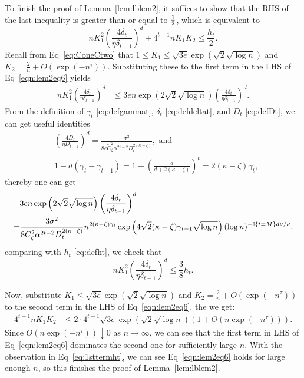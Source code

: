 To finish the proof of Lemma~\ref{lem:lblem2}, it suffices to show that the RHS of the last inequality is greater than or equal to $\frac{1}{2}$,
which is equivalent to
\begin{equation}
\label{eqn:lem2eq6}
n K_1^2 \left ( \frac{4\delta_t} {\eta \delta_{t-1}} \right )^d + 4^{t-1} n K_1 K_2 \leq \frac{h_t}{2}.
\end{equation}
Recall from Eq~\eqref{eq:ConeCtwo} that $1 \leq K_1 \leq \sqrt {3e} \exp(\sqrt 2 \sqrt {\log n})$
and $K_2 = \frac{2}{n} + O(\exp(-n^\tau))$. Substituting these to the first term in the LHS of Eq~\eqref{eqn:lem2eq6} yields
\begin{align*}
	n K_1^2 \left ( \frac{4\delta_t} {\eta \delta_{t-1}} \right )^d 
	&\leq 3 e n \exp \left (2\sqrt 2 \sqrt{\log n} \right ) \left ( \frac{4\delta_t} {\eta \delta_{t-1}} \right )^d.
\end{align*}
From the definition of $\gamma_t$ \eqref{eq:defgammat}, $\delta_t$ \eqref{eq:defdeltat}, and $D_t$ \eqref{eq:defDt},
we can get useful identities 
\begin{align*}
	&\left ( \frac{4D_t} {\eta D_{t-1}} \right )^d = \frac{\sigma^2}{8 e \tilde C_\zeta^2 \alpha^{2t-2} D_t^{2(\kappa-\zeta)}}, \text{ and }\\
	&1-d(\gamma_t - \gamma_{t-1}) = 1-\left( \frac{d}{d+2(\kappa-\zeta)} \right)^t = 2(\kappa-\zeta) \gamma_t,
\end{align*}
thereby one can get
\begin{align*}
	&3 e n \exp \left (2\sqrt 2 \sqrt{\log n} \right ) \left ( \frac{4\delta_t} {\eta \delta_{t-1}} \right )^d\\
	=& \frac{3 \sigma^2}{8 C_\zeta^2 \alpha^{2t-2} D_t^{2(\kappa-\zeta)}} 
	n^{2(\kappa-\zeta) \gamma_t} 
	\exp \left (4\sqrt{2} (\kappa-\zeta) \gamma_{t-1} \sqrt{\log n} \right)
	(\log n)^{-\mathbb{I}\left\{{t=M}\right\}d\nu/\kappa}.
\end{align*}
comparing with $h_t$ \eqref{eq:defht}, we check that 
\begin{equation}
\label{eq:1sttermht}
n K_1^2 \left ( \frac{4\delta_t} {\eta \delta_{t-1}} \right )^d \leq \frac{3}{8} h_t.
\end{equation}

Now, substitute $K_1 \leq \sqrt {3e} \exp(\sqrt 2 \sqrt {\log n})$
and $K_2 = \frac{2}{n} + O(\exp(-n^\tau))$ to the second term in the LHS of Eq~\eqref{eqn:lem2eq6},
the we get:
\begin{align*}
	4^{t-1} n K_1 K_2 
	& \leq 2 \cdot 4^{t-1} \sqrt{3e} \exp \left (\sqrt 2 \sqrt{\log n} \right ) 
	\left ( 1 + O(n\exp(-n^\tau)) \right ).
\end{align*}
Since $O(n\exp(-n^\tau)) \downarrow 0$ as $n \rightarrow \infty$,
we can see that the first term in LHS of Eq~\eqref{eqn:lem2eq6} dominates 
the second one for sufficiently large $n$.
With the observation in Eq~\eqref{eq:1sttermht}, we can see 
Eq~\eqref{eqn:lem2eq6} holds for large enough $n$,
so this finishes the proof of Lemma~\ref{lem:lblem2}.


